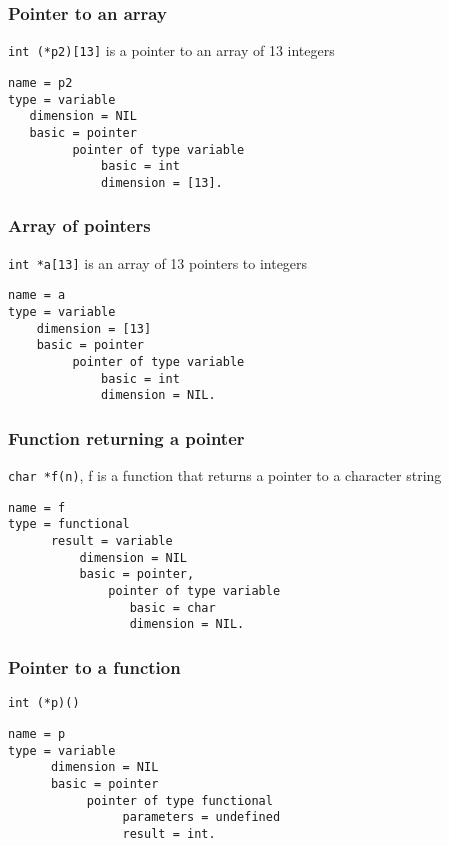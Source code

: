 \documentclass[a4paper]{article}
\begin{document}
\subsubsection{Pointer to an array}
\verb/int (*p2)[13]/ is a pointer to an array of 13 integers
\begin{verbatim}
name = p2
type = variable
   dimension = NIL
   basic = pointer
         pointer of type variable
             basic = int
             dimension = [13].
\end{verbatim}
\subsubsection{Array of pointers}
\verb/int *a[13]/ is an array of 13 pointers to integers
\begin{verbatim}
name = a
type = variable
    dimension = [13]
    basic = pointer
         pointer of type variable
             basic = int
             dimension = NIL.
\end{verbatim}
\subsubsection{Function returning a pointer}
\verb/char *f(n)/, f is a function that returns a pointer to a character
string
\begin{verbatim}
name = f
type = functional 
      result = variable
          dimension = NIL
          basic = pointer,
              pointer of type variable
                 basic = char
                 dimension = NIL. 
\end{verbatim}
\subsubsection{Pointer to a function}
\verb/int (*p)()/
\begin{verbatim}
name = p
type = variable
      dimension = NIL
      basic = pointer
           pointer of type functional
                parameters = undefined
                result = int.
\end{verbatim}
\end{document}
